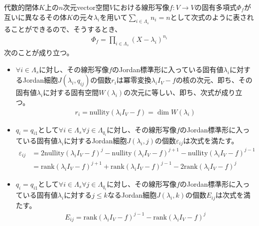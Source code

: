 \documentclass[dvipdfmx]{jsarticle}
\begin{document}
\begin{thm}\label{2.2.6.3}
代数的閉体$K$上の$n$次元vector空間$V$における線形写像$f:V \rightarrow V$の固有多項式$\varPhi_{f}$が互いに異なるその体$K$の元々$\lambda_{i}$を用いて$\sum_{i \in \varLambda_{s}} n_{i} = n$として次式のように表されることができるので、そうするとき、
\begin{align*}
\varPhi_{f} = \prod_{i \in \varLambda_{s}} \left( X - \lambda_{i} \right)^{n_{i}}
\end{align*}
次のことが成り立つ。
\begin{itemize}
\item
  $\forall i \in \varLambda_{s}$に対し、その線形写像$f$のJordan標準形に入っている固有値$\lambda_{i}$に対するJordan細胞$J\left( \lambda_{i},q_{ij} \right)$の個数$r_{i}$は冪零変換$\lambda_{i}I_{V} - f$の核の次元、即ち、その固有値$\lambda_{i}$に対する固有空間$W\left( \lambda_{i} \right)$の次元に等しい、即ち、次式が成り立つ。
\begin{align*}
r_{i} = {\mathrm{nullity}}\left( \lambda_{i}I_{V} - f \right) = \dim{W\left( \lambda_{i} \right)}
\end{align*}
\item
  $q_{i} = q_{i1}$として$\forall i \in \varLambda_{s}\forall j \in \varLambda_{q_{i}}$に対し、その線形写像$f$のJordan標準形に入っている固有値$\lambda_{i}$に対するJordan細胞$J\left( \lambda_{i},j \right)$の個数$\varepsilon_{ij}$は次式を満たす。
\begin{align*}
\varepsilon_{ij} &= 2{\mathrm{nullity}}\left( \lambda_{i}I_{V} - f \right)^{j} - {\mathrm{nullity}}\left( \lambda_{i}I_{V} - f \right)^{j + 1} - {\mathrm{nullity}}\left( \lambda_{i}I_{V} - f \right)^{j - 1}\\
&= {\mathrm{rank}}\left( \lambda_{i}I_{V} - f \right)^{j + 1} + {\mathrm{rank}}\left( \lambda_{i}I_{V} - f \right)^{j - 1} - 2{\mathrm{rank}}\left( \lambda_{i}I_{V} - f \right)^{j}
\end{align*}
\item
  $q_{i} = q_{i1}$として$\forall i \in \varLambda_{s}\forall j \in \varLambda_{q_{i}}$に対し、その線形写像$f$のJordan標準形に入っている固有値$\lambda_{i}$に対する$j \leq k$なるJordan細胞$J\left( \lambda_{i},k \right)$の個数$E_{ij}$は次式を満たす。
\begin{align*}
E_{ij} = {\mathrm{rank}}\left( \lambda_{i}I_{V} - f \right)^{j - 1} - {\mathrm{rank}}\left( \lambda_{i}I_{V} - f \right)^{j}
\end{align*}
\end{itemize}
\end{thm}
\end{document}
